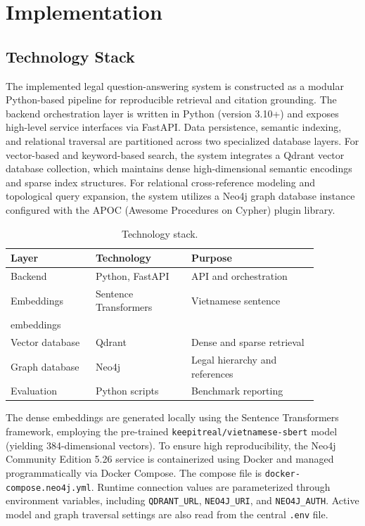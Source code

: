 \chapter{Implementation}
\label{ch:implementation}

\section{Technology Stack}
The implemented legal question-answering system is constructed as a modular Python-based pipeline for reproducible retrieval and citation grounding. The backend orchestration layer is written in Python (version 3.10+) and exposes high-level service interfaces via FastAPI. Data persistence, semantic indexing, and relational traversal are partitioned across two specialized database layers. For vector-based and keyword-based search, the system integrates a Qdrant vector database collection, which maintains dense high-dimensional semantic encodings and sparse index structures. For relational cross-reference modeling and topological query expansion, the system utilizes a Neo4j graph database instance configured with the APOC (Awesome Procedures on Cypher) plugin library.

\begin{table}[H]
  \centering
  \caption{Technology stack.}
  \label{tab:technology-stack}
  \begin{tabular}{p{0.24\linewidth}p{0.27\linewidth}p{0.36\linewidth}}
    \toprule
    Layer & Technology & Purpose \\
    \midrule
    Backend & Python, FastAPI & API and orchestration \\
    Embeddings & Sentence Transformers & Vietnamese sentence\\ embeddings \\
    Vector database & Qdrant & Dense and sparse retrieval \\
    Graph database & Neo4j & Legal hierarchy and references \\
    Evaluation & Python scripts & Benchmark reporting \\
    \bottomrule
  \end{tabular}
\end{table}

The dense embeddings are generated locally using the Sentence Transformers framework, employing the pre-trained \texttt{keepitreal/\allowbreak{}vietnamese-sbert} model (yielding 384-dimensional vectors). To ensure high reproducibility, the Neo4j Community Edition 5.26 service is containerized using Docker and managed programmatically via Docker Compose. The compose file is \texttt{docker-compose.\allowbreak{}neo4j.yml}. Runtime connection values are parameterized through environment variables, including \texttt{QDRANT\_URL}, \texttt{NEO4J\_URI}, and \texttt{NEO4J\_AUTH}. Active model and graph traversal settings are also read from the central \texttt{.env} file.

